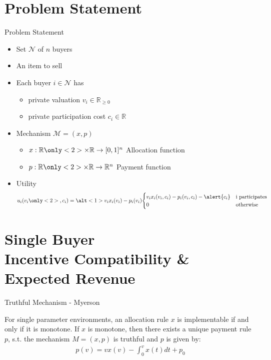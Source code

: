 \documentclass{beamer}
\begin{document}
\section{Problem Statement}
\begin{frame}{Problem Statement}
  \begin{itemize}
    \item Set $\mathcal{N}$ of $n$ buyers
    \item An item to sell
    \item Each buyer $i \in \mathcal{N}$ has
          \begin{itemize}
            \item private valuation $v_i \in \mathbb{R}_{\geq0}$
            \item<2-> \alert{private participation cost $c_i \in \mathbb{R}$}
          \end{itemize}
    \item Mechanism $\mathcal{M} = (x,p)$
          \begin{itemize}
            \item $x: \mathbb{R} \only<2>{\times \mathbb{R}} \rightarrow [0,1]^n$ Allocation function
            \item $p: \mathbb{R} \only<2>{\times \mathbb{R}} \rightarrow \mathbb{R}^n$ Payment function
          \end{itemize}
    \item Utility
          \begin{align*}
            u_i(v_i\only<2>{, c_i}) = \alt<1>{v_i x_i(v_i) - p_i(v_i)}{\begin{cases}v_i x_i(v_i, c_i) - p_i(v_i, c_i) - \alert{c_i} & \text{i participates} \\ 0 & \text{otherwise}\end{cases}}
          \end{align*}
  \end{itemize}
\end{frame}
\section{Single Buyer \\ Incentive Compatibility \& Expected Revenue}

\begin{frame}{Truthful Mechanism - Myerson}
  \begin{lemma}
    For single parameter environments, an allocation rule $x$ is implementable if and only if it is monotone.
    If $x$ is monotone, then there exists a unique payment rule $p$, s.t. the mechanism $M=(x,p)$ is truthful
    and $p$ is given by:
    \begin{align*}
      p(v) = v x(v) - \int_0^v x(t) dt + p_0
    \end{align*}
  \end{lemma}
\end{frame}
\end{document}
